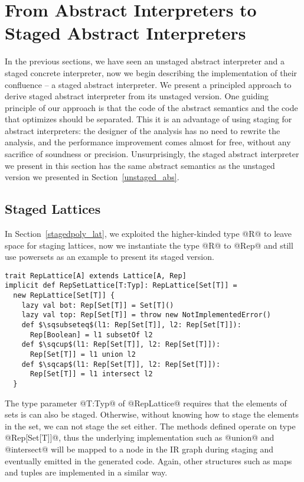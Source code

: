 \section{From Abstract Interpreters to Staged Abstract Interpreters} \label{sai}

In the previous sections, we have seen an unstaged abstract interpreter and a staged concrete interpreter, 
now we begin describing the implementation of their confluence -- a staged abstract interpreter. 
We present a principled approach to derive staged abstract interpreter
from its unstaged version. One guiding principle of our approach is that the code of the abstract semantics
and the code that optimizes should be separated. This it is an advantage of using staging 
for abstract interpreters: the designer of the analysis has no need to rewrite the analysis, and 
the performance improvement comes almost for free, without any sacrifice of soundness or precision.
Unsurprisingly, the staged abstract interpreter we present in this section has the same abstract 
semantics as the unstaged version we presented in Section~\ref{unstaged_abs}.

\subsection{Staged Lattices} 
In Section~\ref{stagedpoly_lat}, we exploited the higher-kinded type @R@
to leave space for staging lattices, now we instantiate the type @R@ to @Rep@ and 
still use powersets as an example to present its staged version. 

\begin{lstlisting}
trait RepLattice[A] extends Lattice[A, Rep]
implicit def RepSetLattice[T:Typ]: RepLattice[Set[T]] = 
  new RepLattice[Set[T]] {
    lazy val bot: Rep[Set[T]] = Set[T]()
    lazy val top: Rep[Set[T]] = throw new NotImplementedError()
    def $\sqsubseteq$(l1: Rep[Set[T]], l2: Rep[Set[T]]): 
      Rep[Boolean] = l1 subsetOf l2
    def $\sqcup$(l1: Rep[Set[T]], l2: Rep[Set[T]]): 
      Rep[Set[T]] = l1 union l2
    def $\sqcap$(l1: Rep[Set[T]], l2: Rep[Set[T]]): 
      Rep[Set[T]] = l1 intersect l2
  }
\end{lstlisting}

The type parameter @T:Typ@ of @RepLattice@ requires that the elements of sets
is can also be staged. Otherwise, without knowing how to stage the elements in the set,
we can not stage the set either.
The methods defined operate on type @Rep[Set[T]]@, thus the underlying implementation
such as @union@ and @intersect@ will be mapped to a node in the IR graph during staging and 
eventually emitted in the generated code. 
Again, other structures such as maps and tuples are implemented in a similar way.

